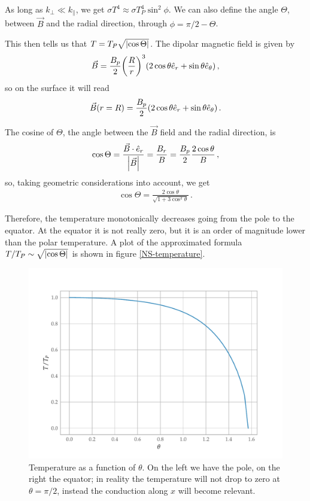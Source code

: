 \documentclass[main.tex]{subfiles}
\begin{document}
As long as \(k_\perp \ll k_\parallel\), we get \(\sigma T^{4} \approx \sigma T_P^{4} \sin^2 \phi \).
We can also define the angle \(\Theta \), between \(\vec{B}\) and the radial direction, through \(\phi = \pi /2 - \Theta \).

This then tells us that \(T = T_P \sqrt{\abs{\cos \Theta }}\).
The dipolar magnetic field is given by 
%
\begin{align}
\vec{B} = \frac{B_p}{2} \qty(\frac{R}{r})^3 \qty(2 \cos \theta \hat{e}_r + \sin \theta \hat{e}_\theta )
\,,
\end{align}
%
so on the surface it will read
%
\begin{align}
\vec{B}(r = R) = \frac{B_p}{2} \qty(2 \cos \theta \hat{e}_r + \sin \theta \hat{e}_\theta )
\,.
\end{align}

The cosine of \(\Theta \), the angle between the \(\vec{B}\) field and the radial direction, is 
%
\begin{align}
\cos \Theta = \frac{\vec{B} \cdot \hat{e}_r}{\abs{\vec{B}}} = \frac{B_r}{B} = \frac{B_p}{2} \frac{2 \cos \theta }{B} 
\,,
\end{align}
%
so, taking geometric considerations into account, we get 
%
\begin{align}
\cos \Theta = \frac{2 \cos \theta }{\sqrt{1 + 3 \cos^2 \theta }}
\,.
\end{align}

Therefore, the temperature monotonically decreases going from the pole to the equator. 
At the equator it is not really zero, but it is an order of magnitude lower than the polar temperature. A plot of the approximated formula \(T/ T_P \sim \sqrt{\abs{\cos \Theta }}\) is shown in figure \ref{NS-temperature}.

\begin{figure}[ht]
\centering
\includegraphics[width=.8\textwidth]{figures/NS-temperature}
\caption{Temperature as a function of \(\theta \). On the left we have the pole, on the right the equator; in reality the temperature will not drop to zero at \(\theta = \pi /2\), instead the conduction along \(x\) will become relevant.}
\label{fig:NS-temperature}
\end{figure}
\end{document}
